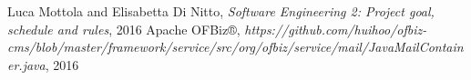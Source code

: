 	Luca Mottola and Elisabetta Di Nitto, \emph{Software Engineering 2: Project goal, schedule and rules}, 2016
	Apache OFBiz®, \emph{https://github.com/huihoo/ofbiz-cms/blob/master/framework/service/src/org/ofbiz/service/mail/JavaMailContainer.java}, 2016
	